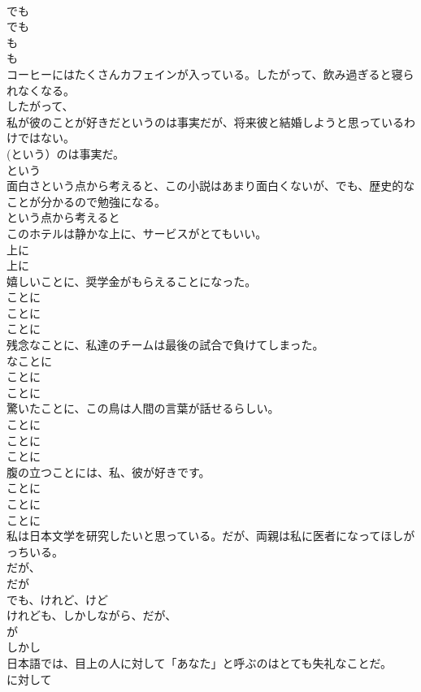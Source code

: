 \documentclass[8pt]{extreport}
\begin{document}
\begin{CJK}{UTF8}{min}
{\\	でも 
\\	でも 
\\	も
\\	も 
\\	コーヒーにはたくさんカフェインが入っている。したがって、飲み過ぎると寝られなくなる。	
\\	したがって、
\\	私が彼のことが好きだというのは事実だが、将来彼と結婚しようと思っているわけではない。	
\\	(という）のは事実だ。 
\\	という 
\\	面白さという点から考えると、この小説はあまり面白くないが、でも、歴史的なことが分かるので勉強になる。	
\\	という点から考えると 
\\	このホテルは静かな上に、サービスがとてもいい。	
\\	上に 
\\	上に 
\\	嬉しいことに、奨学金がもらえることになった。	
\\	ことに 
\\	ことに 
\\	ことに 
\\	残念なことに、私達のチームは最後の試合で負けてしまった。	
\\	なことに 
\\	ことに 
\\	ことに 
\\	驚いたことに、この鳥は人間の言葉が話せるらしい。	
\\	ことに 
\\	ことに 
\\	ことに 
\\	腹の立つことには、私、彼が好きです。	
\\	ことに 
\\	ことに 
\\	ことに 
\\	私は日本文学を研究したいと思っている。だが、両親は私に医者になってほしがっちいる。	
\\	だが、
\\	だが　
\\	でも、けれど、けど 
\\	けれども、しかしながら、だが、
\\	が 
\\	しかし 
\\	日本語では、目上の人に対して「あなた」と呼ぶのはとても失礼なことだ。	
\\	に対して 
}
\end{CJK}
\end{document}
